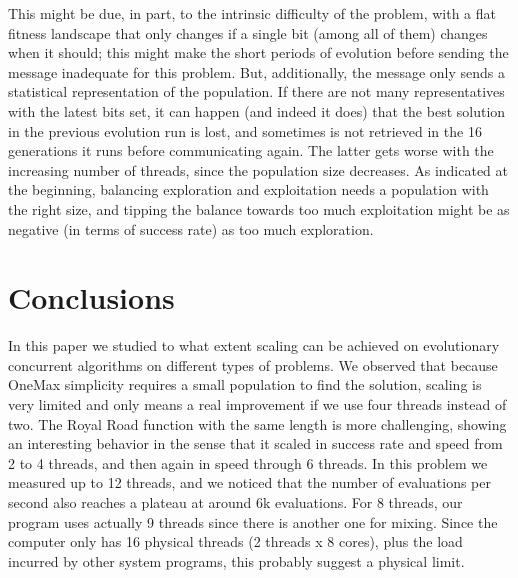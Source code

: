\documentclass[runningheads]{llncs}\usepackage[]{graphicx}\usepackage[]{color}
\begin{document}
This might be due, in part, to the intrinsic difficulty of the
problem, with a flat fitness landscape that only changes if a single
bit (among all of them) changes when it should; this might make the
short periods of evolution before sending the message inadequate for
this problem. But, additionally, the message only sends a statistical
representation of the population. If there are not many
representatives with the latest bits set, it can happen (and indeed it
does) that the best solution in the previous evolution run is lost,
and sometimes is not retrieved in the 16 generations it runs before
communicating again. The latter gets worse with the increasing number of
threads, since the population size decreases. As indicated at the
beginning, balancing exploration and exploitation needs a population
with the right size, and tipping the balance towards too much exploitation
might be as negative (in terms of success rate) as too much exploration.



\section{Conclusions}
\label{sec:conclusions}

In this paper we studied to what extent scaling can be achieved 
on evolutionary concurrent algorithms on different types of problems. 
We observed that because OneMax simplicity requires a small population
to find the solution, scaling is very limited
and only means a real improvement if we use four threads instead of
two. The Royal Road function with the same length is more challenging, showing an
interesting behavior in the sense that it scaled in success rate and
speed from 2 to 4 threads, and then again in speed through 6
threads. In this problem we measured up to 12 threads, and we
noticed that the number of evaluations per second also reaches a
plateau at around 6k evaluations. For 8 threads, our program uses
actually 9 threads since there is another one for mixing. Since the
computer only has 16 physical threads (2 threads x 8 cores), plus
the load incurred by other system programs, this probably suggest a
physical limit. %
\end{document}
